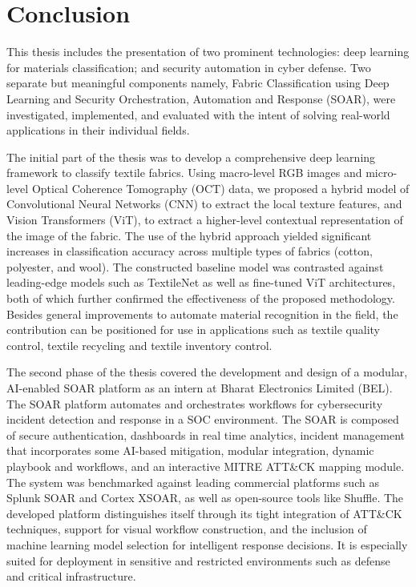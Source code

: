 \chapter{Conclusion}

This thesis includes the presentation of two prominent technologies: deep learning for materials classification; and security automation in cyber defense. Two separate but meaningful components namely, Fabric Classification using Deep Learning and Security Orchestration, Automation and Response (SOAR), were investigated, implemented, and evaluated with the intent of solving real-world applications in their individual fields.

The initial part of the thesis was to develop a comprehensive deep learning framework to classify textile fabrics. Using macro-level RGB images and micro-level Optical Coherence Tomography (OCT) data, we proposed a hybrid model of Convolutional Neural Networks (CNN) to extract the local texture features, and Vision Transformers (ViT), to extract a higher-level contextual representation of the image of the fabric. The use of the hybrid approach yielded significant increases in classification accuracy across multiple types of fabrics (cotton, polyester, and wool). The constructed baseline model was contrasted against leading-edge models such as TextileNet as well as fine-tuned ViT architectures, both of which further confirmed the effectiveness of the proposed methodology. Besides general improvements to automate material recognition in the field, the contribution can be positioned for use in applications such as textile quality control, textile recycling and textile inventory control.

The second phase of the thesis covered the development and design of a modular, AI-enabled SOAR platform as an intern at Bharat Electronics Limited (BEL). The SOAR platform automates and orchestrates workflows for cybersecurity incident detection and response in a SOC environment. The SOAR is composed of secure authentication, dashboards in real time analytics, incident management that incorporates some AI-based mitigation, modular integration, dynamic playbook and workflows, and an interactive MITRE ATT\&CK mapping module. The system was benchmarked against leading commercial platforms such as Splunk SOAR and Cortex XSOAR, as well as open-source tools like Shuffle. The developed platform distinguishes itself through its tight integration of ATT\&CK techniques, support for visual workflow construction, and the inclusion of machine learning model selection for intelligent response decisions. It is especially suited for deployment in sensitive and restricted environments such as defense and critical infrastructure.


